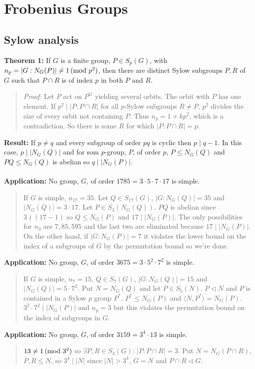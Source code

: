 \chapter{Frobenius Groups}
\section {Sylow analysis}
{\bf Theorem 1:} 
If $G$ is a finite group, $P \in S_p(G)$,  with $n_p = |G:N_G(P)| \ne 1 \thinspace \textnormal{(mod } p^2 \textnormal{)}$,
then there are distinct Sylow subgroups $P, R$ of $G$ such that $P \cap R$ is of index $p$
in both $P$ and $R$.
\begin{quote}
\emph{Proof:}
Let $P$ act on $P^G$ yielding several orbits.  The orbit with $P$ has one element.
If $p^2 \mid |P:P \cap R|$ for all $p$-Sylow subgroups $R \ne P$, $p^2$ divides the size of
every orbit not containing $P$.  Thus $n_p = 1 + kp^2$, which is a contradiction.  So there is
some $R$ for which $|P: P \cap R| = p$.
\end{quote}
{\bf Result:} If $p \ne q$ and every subgroup of order $pq$ is cyclic then $p \mid q-1$.  In this
case, $p \mid |N_G(Q)|$ and for som $p$-group, $P$, of order $p$, $P \leq N_G(Q)$ and $PQ \leq N_G(Q)$ is
abelian so $q \mid |N_G(P)|$.
\\
\\
{\bf Application:} No group, $G$, of order $1785 = 3 \cdot 5 \cdot 7 \cdot 17$ is simple.
\begin{quote}
If $G$ is simple,
$n_{17} =35$.  Let $Q \in S_{17}(G)$, $|G:N_G(Q)|=35$ and $|N_G(Q)|= 3 \cdot 17$.  Let $P \in S_3(N_G(Q))$.
$PQ$ is abelian since $3 \nmid (17 - 1)$ so $Q \leq N_G(P)$ and $17 \mid |N_G(P)|$.  The only possibilities for $n_3$ are
$7, 85, 595$ and the last two are eliminated because $17 \mid |N_G(P)|$.  On the other hand, if $|G:N_G(P)| =7$ it
violates the lower bound on the index of a subgroups of $G$ by the permutation bound so we're done.
\end{quote}
{\bf Application:} No group, $G$, of order $3675 = 3 \cdot 5^2 \cdot 7^2$ is simple.
\begin{quote}
If $G$ is simple, $n_7 = 15$, $Q \in S_7(G)$, $|G:N_G(Q)|= 15$ and $|N_G(Q)|= 5 \cdot 7^2$.  Put $N = N_G(Q)$ and
let $P \in S_5(N)$.  $P \lhd N$ and $P$ is contained in a Sylow $p$ group $P^*$. $P^* \leq N_G(P)$ and 
$\langle N, P^* \rangle= N_G(P)$.  $3^2 \cdot 7^2 \mid |N_G(P)|$ and $n_p = 3$ but this violates
the permutation bound on the index of subgroups in $G$.
\end{quote}
{\bf Application:} No group, $G$, of order $3159= 3^4 \cdot 13$ is simple.
\begin{quote}
$13 \ne 1 \thinspace \textnormal{(mod } 3^2 \textnormal{)}$ so $\exists P, R \in S_3(G)$: $|P:P \cap R| = 3$.  Put $N= N_G(P \cap R)$, $P, R \leq N$,
so $3^4 \mid |N|$ since $|N| > 3^4$, $G = N$ and $P \cap R \lhd G$.
\end{quote}
